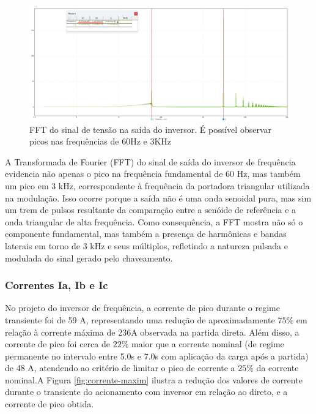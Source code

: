 \documentclass[a4paper, 11pt]{article}
\begin{document}
\begin{figure}[H]
    \centering
    \includegraphics[width=1\linewidth]{fft_2.png}
    \caption{FFT do sinal de tensão na saída do inversor. É possível observar picos nas frequências de 60Hz e 3KHz}
    \label{fig:enter-label}
\end{figure}

A Transformada de Fourier (FFT) do sinal de saída do inversor de frequência evidencia não apenas o pico na frequência fundamental de 60 Hz, mas também um pico em 3 kHz, correspondente à frequência da portadora triangular utilizada na modulação. Isso ocorre porque a saída não é uma onda senoidal pura, mas sim um trem de pulsos resultante da comparação entre a senóide de referência e a onda triangular de alta frequência. Como consequência, a FFT mostra não só o componente fundamental, mas também a presença de harmônicas e bandas laterais em torno de 3 kHz e seus múltiplos, refletindo a natureza pulsada e modulada do sinal gerado pelo chaveamento.

\subsubsection{Correntes Ia, Ib e Ic}

No projeto do inversor de frequência, a corrente de pico durante o regime transiente foi de 59 A, representando uma redução de aproximadamente $75 \%$ em relação à corrente máxima de 236A observada na partida direta. Além disso, a corrente de pico foi cerca de $22 \%$ maior que a corrente nominal  (de regime permanente no intervalo entre 5.0s e 7.0s com aplicação da carga após a partida) de 48 A, atendendo ao critério de limitar o pico de corrente a $25 \%$ da corrente nominal.A Figura \ref{fig:corrente-maxim} ilustra a redução dos valores de corrente durante o transiente do acionamento com inversor em relação ao direto, e a corrente de pico obtida.
\end{document}
